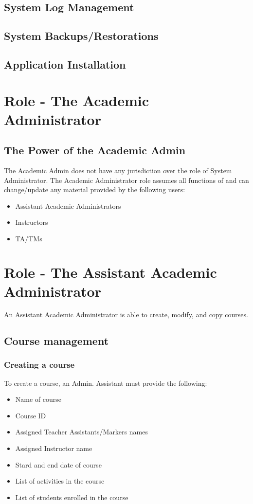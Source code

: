 \documentclass{article}
\begin{document}
\subsection{System Log Management}
\subsection{System Backups/Restorations}
\subsection{Application Installation}

\section{Role - The Academic Administrator}
\subsection{The Power of the Academic Admin}
The Academic Admin does not have any jurisdiction over the role of System Administrator.
The Academic Administrator role assumes all functions of and can change/update any material
provided by the following users:
\begin{itemize}
  \item Assistant Academic Administrators
  \item Instructors
  \item TA/TMs
\end{itemize}

\section{Role - The Assistant Academic Administrator}
An Assistant Academic Administrator is able to create, modify, and copy courses.
\subsection {Course management}
\subsubsection{Creating a course}
To create a course, an Admin. Assistant must provide the following:
\begin{itemize}
	\item Name of course
	\item Course ID
	\item Assigned Teacher Assistants/Markers names
	\item Assigned Instructor name
	\item Stard and end date of course
	\item List of activities in the course
	\item List of students enrolled in the course
\end{itemize}
\end{document}
